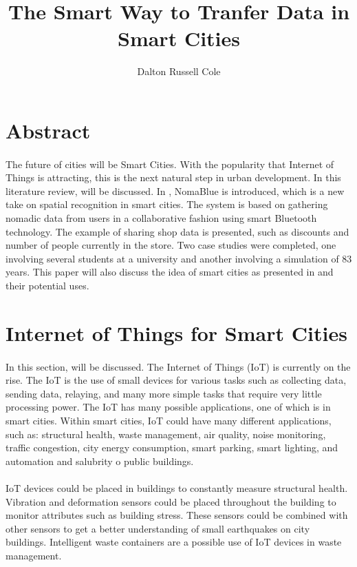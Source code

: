\documentclass[a4paper,12pt]{article}
\title{The Smart Way to Tranfer Data in Smart Cities}
\author{Dalton Russell Cole}
\begin{document}
\newpage


\section*{Abstract}
\paragraph{}
The future of cities will be Smart Cities. With the popularity that Internet of Things is attracting, this is the next natural step in urban development. In this literature review, \cite{SC} will be discussed. In \cite{SC}, NomaBlue is introduced, which is a new take on spatial recognition in smart cities. The system is based on gathering nomadic data from users in a collaborative fashion using smart Bluetooth technology. The example of sharing shop data is presented, such as discounts and number of people currently in the store. Two case studies were completed, one involving several students at a university and another involving a simulation of 83 years. This paper will also discuss the idea of smart cities as presented in \cite{IOT} and their potential uses.

\section*{Internet of Things for Smart Cities}
\paragraph{}
In this section, \cite{IOT} will be discussed. The Internet of Things (IoT) is currently on the rise. The IoT is the use of small devices for various tasks such as collecting data, sending data, relaying, and many more simple tasks that require very little processing power. The IoT has many possible applications, one of which is in smart cities. Within smart cities, IoT could have many different applications, such as: structural health, waste management, air quality, noise monitoring, traffic congestion, city energy consumption, smart parking, smart lighting, and automation and salubrity o public buildings.
\paragraph{}
IoT devices could be placed in buildings to constantly measure structural health. Vibration and deformation sensors could be placed throughout the building to monitor attributes such as building stress. These sensors could be combined with other sensors to get a better understanding of small earthquakes on city buildings. Intelligent waste containers are a possible use of IoT devices in waste management. 
\end{document}
